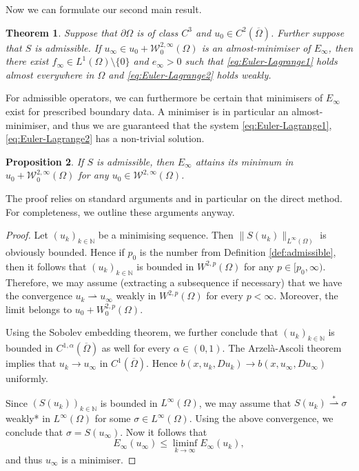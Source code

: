 \documentclass[a4paper]{article}
\newcommand{\N}{\mathbb{N}}
\newcommand{\W}{\mathcal{W}}
\newtheorem{theorem}{Theorem}
\newtheorem{proposition}[theorem]{Proposition}
\theoremstyle{remark}
\begin{document}
Now we can formulate our second main result.

\begin{theorem} \label{thm:necessity}
Suppose that $\partial \Omega$ is of class $C^3$ and $u_0 \in C^2(\overline{\Omega})$.
Further suppose that $S$ is admissible.
If $u_\infty \in u_0 + \W_0^{2, \infty}(\Omega)$ is an almost-minimiser of $E_\infty$, then there exist $f_\infty \in L^1(\Omega) \setminus \{0\}$ and $e_\infty > 0$ such that \eqref{eq:Euler-Lagrange1} holds almost everywhere in $\Omega$ and \eqref{eq:Euler-Lagrange2} holds weakly.
\end{theorem}

For admissible operators, we can furthermore be
certain that minimisers of $E_\infty$ exist for prescribed boundary data. A minimiser
is in particular an almost-minimiser, and thus we are guaranteed that
the system \eqref{eq:Euler-Lagrange1}, \eqref{eq:Euler-Lagrange2} has a
non-trivial solution.

\begin{proposition} \label{prp:minimisers}
If $S$ is admissible, then $E_\infty$ attains its minimum in
$u_0 + \W_0^{2, \infty}(\Omega)$ for any $u_0 \in \W^{2, \infty}(\Omega)$.
\end{proposition}

The proof relies on standard arguments and in particular on the
direct method. For completeness, we outline
these arguments anyway.

\begin{proof}
Let $(u_k)_{k \in \N}$ be a minimising sequence. Then $\|S(u_k)\|_{L^\infty(\Omega)}$ is obviously bounded. Hence if $p_0$ is the number from Definition \ref{def:admissible}, then
it follows that $(u_k)_{k \in \N}$ is bounded in $W^{2, p}(\Omega)$ for any $p \in [p_0, \infty)$.
Therefore, we may assume (extracting a subsequence if necessary) that we have the convergence
$u_k \rightharpoonup u_\infty$ weakly in $W^{2, p}(\Omega)$ for every $p < \infty$. Moreover, the limit belongs to $u_0 + W_0^{2, p}(\Omega)$.

Using the Sobolev embedding theorem, we further conclude that $(u_k)_{k \in \N}$ is bounded in $C^{1, \alpha}(\overline{\Omega})$ as well for every $\alpha \in (0, 1)$. The Arzel\`a-Ascoli theorem implies that $u_k \to u_\infty$ in $C^1(\overline{\Omega})$. Hence $b(x, u_k, Du_k) \to b(x, u_\infty, Du_\infty)$ uniformly.

Since $(S(u_k))_{k \in \N}$ is bounded in $L^\infty(\Omega)$, we may assume that
$S(u_k) \stackrel{*}{\rightharpoonup} \sigma$ weakly* in $L^\infty(\Omega)$ for some $\sigma \in L^\infty(\Omega)$. Using the above convergence, we conclude that $\sigma = S(u_\infty)$. Now it follows that
\[
E_\infty(u_\infty) \le \liminf_{k \to \infty} E_\infty(u_k),
\]
and thus $u_\infty$ is a minimiser.
\end{proof}
\end{document}
